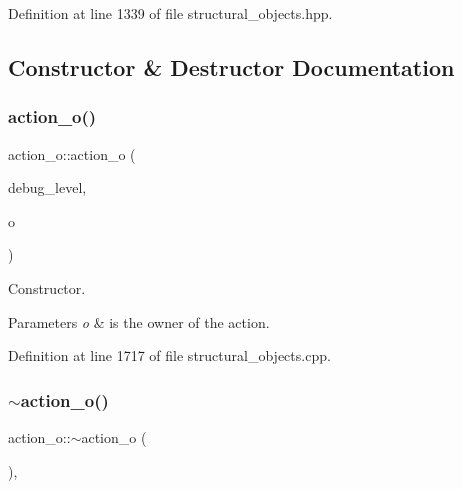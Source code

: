 Definition at line 1339 of file structural\+\_\+objects.\+hpp.



\subsection{Constructor \& Destructor Documentation}
\mbox{\label{classaction__o_a6aa8f1b9ef49fa9e12f83f0d7f8bd91c}} 
\subsubsection{\texorpdfstring{action\+\_\+o()}{action\_o()}}
{\footnotesize\ttfamily action\+\_\+o\+::action\+\_\+o (\begin{DoxyParamCaption}\item[{int}]{debug\+\_\+level,  }\item[{const \hyperlink{structural__objects_8hpp_a8ea5f8cc50ab8f4c31e2751074ff60b2}{structural\+\_\+object\+Ref}}]{o }\end{DoxyParamCaption})}



Constructor. 


\begin{DoxyParams}{Parameters}
{\em o} & is the owner of the action. \\
\hline
\end{DoxyParams}


Definition at line 1717 of file structural\+\_\+objects.\+cpp.

\mbox{\label{classaction__o_a7fc419000ac693d2000cd4589aff755b}} 
\subsubsection{\texorpdfstring{$\sim$action\+\_\+o()}{~action\_o()}}
{\footnotesize\ttfamily action\+\_\+o\+::$\sim$action\+\_\+o (\begin{DoxyParamCaption}{ }\end{DoxyParamCaption})\hspace{0.3cm}{\ttfamily [override]}, {\ttfamily [default]}}




